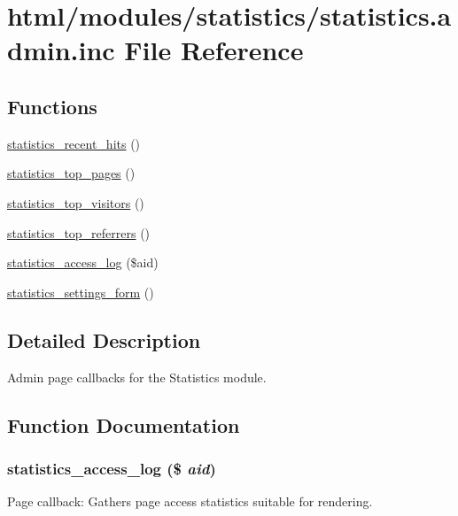 \hypertarget{statistics_8admin_8inc}{
\section{html/modules/statistics/statistics.admin.inc File Reference}
\label{statistics_8admin_8inc}
}
\subsection*{Functions}
\begin{DoxyCompactItemize}
\item 
\hyperlink{statistics_8admin_8inc_a27cb7cc9ddce90da1b0a6c8c5e469dc9}{statistics\_\-recent\_\-hits} ()
\item 
\hyperlink{statistics_8admin_8inc_a9bae73cb7e5a689cbe7e43aefd9205fc}{statistics\_\-top\_\-pages} ()
\item 
\hyperlink{statistics_8admin_8inc_a39dd048ed9a9e6eef337edcbc8ef7501}{statistics\_\-top\_\-visitors} ()
\item 
\hyperlink{statistics_8admin_8inc_a18a38dae66754e711f1d04ec2fe4e3e1}{statistics\_\-top\_\-referrers} ()
\item 
\hyperlink{statistics_8admin_8inc_aca44598ce09dc1c87313b2bef40e3807}{statistics\_\-access\_\-log} (\$aid)
\item 
\hyperlink{group__forms_ga4b472705b18d63698ecd05ff23ef152b}{statistics\_\-settings\_\-form} ()
\end{DoxyCompactItemize}


\subsection{Detailed Description}
Admin page callbacks for the Statistics module. 

\subsection{Function Documentation}
\hypertarget{statistics_8admin_8inc_aca44598ce09dc1c87313b2bef40e3807}{
\subsubsection[{statistics\_\-access\_\-log}]{\setlength{\rightskip}{0pt plus 5cm}statistics\_\-access\_\-log (\$ {\em aid})}}
\label{statistics_8admin_8inc_aca44598ce09dc1c87313b2bef40e3807}
Page callback: Gathers page access statistics suitable for rendering.


